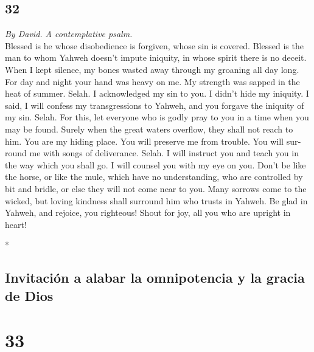 \begin{paracol}{2}
\switchcolumn
\begin{otherlanguage}{english}

\hypertarget{section-63}{%
\section{32}\label{section-63}}

\emph{By David. A contemplative psalm.}\\
 Blessed is he whose disobedience is forgiven, whose sin
is covered.  Blessed is the man to whom Yahweh doesn't
impute iniquity, in whose spirit there is no deceit.  When
I kept silence, my bones wasted away through my groaning all day long.
 For day and night your hand was heavy on me. My strength
was sapped in the heat of summer. Selah.  I acknowledged
my sin to you. I didn't hide my iniquity. I said, I will confess my
transgressions to Yahweh, and you forgave the iniquity of my sin. Selah.
 For this, let everyone who is godly pray to you in a time
when you may be found. Surely when the great waters overflow, they shall
not reach to him.  You are my hiding place. You will
preserve me from trouble. You will surround me with songs of
deliverance. Selah.  I will instruct you and teach you in
the way which you shall go. I will counsel you with my eye on you.
 Don't be like the horse, or like the mule, which have no
understanding, who are controlled by bit and bridle, or else they will
not come near to you.  Many sorrows come to the wicked,
but loving kindness shall surround him who trusts in Yahweh.
 Be glad in Yahweh, and rejoice, you righteous! Shout for
joy, all you who are upright in heart!

\end{otherlanguage}

\switchcolumn[0]*

\hypertarget{invitaciuxf3n-a-alabar-la-omnipotencia-y-la-gracia-de-dios}{%
\subsection{Invitación a alabar la omnipotencia y la gracia de
Dios}\label{invitaciuxf3n-a-alabar-la-omnipotencia-y-la-gracia-de-dios}}

\hypertarget{section-64}{%
\section{33}\label{section-64}}


\end{paracol}
